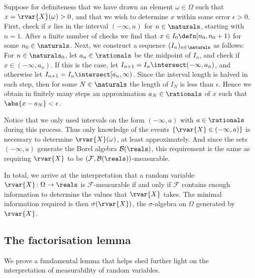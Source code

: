 \documentclass[article, a4paper, 11pt, oneside]{memoir}
\numberwithin{equation}{chapter}
\newcommand{\calB}{\mathcal{B}}
\newcommand{\calF}{\mathcal{F}}
\newcommand{\borel}[1]{\calB(#1)}
\begin{document}
Suppose for definiteness that we have drawn an element $\omega \in \Omega$ such that $x = \rvar{X}(\omega) > 0$, and that we wish to determine $x$ within some error $\epsilon > 0$. First, check if $x$ lies in the interval $(-\infty,n)$ for $n \in \naturals$, starting with $n = 1$. After a finite number of checks we find that $x \in I_0 \defn [n_0, n_0+1)$ for some $n_0 \in \naturals$. Next, we construct a sequence $(I_n)_{n\in\naturals}$ as follows: For $n \in \naturals_0$, let $a_n \in \rationals$ be the midpoint of $I_n$, and check if $x \in (-\infty, a_n)$. If this is the case, let $I_{n+1} = I_n \intersect (-\infty, a_n)$, and otherwise let $I_{n+1} = I_n \intersect [a_n, \infty)$. Since the interval length is halved in each step, then for some $N \in \naturals$ the length of $I_N$ is less than $\epsilon$. Hence we obtain in finitely many steps an approximation $a_N \in \rationals$ of $x$ such that $\abs{x-a_N} < \epsilon$.

Notice that we only used intervals on the form $(-\infty, a)$ with $a \in \rationals$ during this process. Thus only knowledge of the events $\{\rvar{X} \in (-\infty, a)\}$ is necessary to determine $\rvar{X}(\omega)$, at least approximately. And since the sets $(-\infty, a)$ generate the Borel algebra $\borel{\reals}$, this requirement is the same as requiring $\rvar{X}$ to be $(\calF,\borel{\reals})$-measurable.

In total, we arrive at the interpretation that a random variable $\rvar{X} \colon \Omega \to \reals$ is $\calF$-measurable if and only if $\calF$ contains enough information to determine the values that $\rvar{X}$ takes. The minimal information required is then $\sigma(\rvar{X})$, the $\sigma$-algebra on $\Omega$ generated by $\rvar{X}$.


\subsection{The factorisation lemma}

We prove a fundamental lemma that helps shed further light on the interpretation of measurability of random variables.
\end{document}
